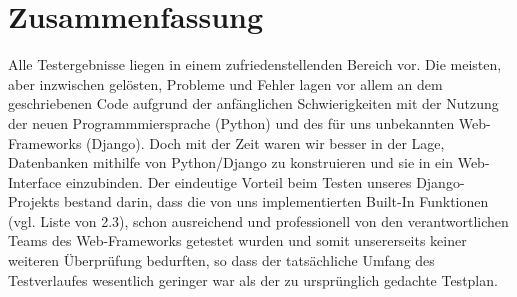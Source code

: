 

\chapter{Zusammenfassung}
Alle Testergebnisse liegen in einem zufriedenstellenden Bereich vor. 
Die meisten, aber inzwischen gelösten, Probleme und Fehler lagen vor allem an 
dem geschriebenen Code aufgrund der anfänglichen Schwierigkeiten mit der Nutzung 
der neuen Programmmiersprache (Python) und des für uns unbekannten Web-Frameworks 
(Django).
Doch mit der Zeit waren wir besser in der Lage, Datenbanken mithilfe von 
Python/Django zu konstruieren und sie in ein Web-Interface einzubinden. 
Der eindeutige Vorteil beim Testen unseres Django-Projekts bestand darin, dass die
von uns implementierten Built-In Funktionen (vgl. Liste von 2.3), schon 
ausreichend und professionell von den verantwortlichen Teams des Web-Frameworks
getestet wurden und somit unsererseits keiner weiteren Überprüfung bedurften, 
so dass der tatsächliche Umfang des Testverlaufes wesentlich geringer war 
als der zu ursprünglich gedachte Testplan. 

